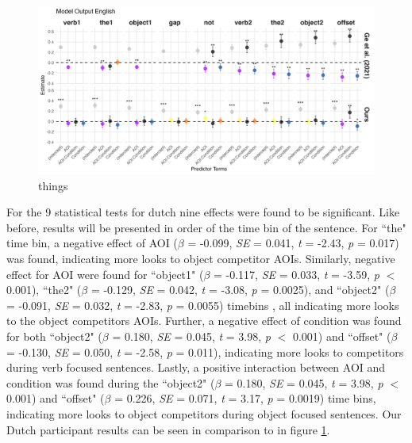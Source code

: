 \begin{figure}[H]  %
    \centering
    \includegraphics[width=\textwidth,height=\textheight,keepaspectratio]{viz/model_plot_english.png}
    \caption{things}
    \label{fig:model_plot_english}
\end{figure}

For the 9 statistical tests for dutch nine effects were found to be significant. Like before, results will be presented in order of the time bin of the sentence. For ``the" time bin, a negative effect of AOI ($\beta$ = -0.099, \textit{SE} = 0.041, \textit{t} = -2.43, \textit{p} = 0.017) was found, indicating more looks to object competitor AOIs. Similarly, negative effect for AOI were found for ``object1" ($\beta$ = -0.117, \textit{SE} = 0.033, \textit{t} = -3.59, \textit{p} $<$ 0.001), ``the2" ($\beta$ = -0.129, \textit{SE} = 0.042, \textit{t} = -3.08, \textit{p} = 0.0025), and ``object2" ($\beta$ = -0.091, \textit{SE} = 0.032, \textit{t} = -2.83, \textit{p} = 0.0055) timebins , all indicating more looks to the object competitors AOIs. Further, a negative effect of condition was found for both ``object2" ($\beta$ = 0.180, \textit{SE} = 0.045, \textit{t} = 3.98, \textit{p} $<$ 0.001) and ``offset" ($\beta$ = -0.130, \textit{SE} = 0.050, \textit{t} = -2.58, \textit{p} = 0.011), indicating more looks to competitors during verb focused sentences. Lastly, a positive interaction between AOI and condition was found during the ``object2" ($\beta$ = 0.180, \textit{SE} = 0.045, \textit{t} = 3.98, \textit{p} $<$ 0.001) and ``offset" ($\beta$ = 0.226, \textit{SE} = 0.071, \textit{t} = 3.17, \textit{p} = 0.0019)
time bins, indicating more looks to object competitors during object focused sentences. Our Dutch participant results can be seen in comparison to \cite{Ge2021} in figure \ref{fig:model_plot_english}.


